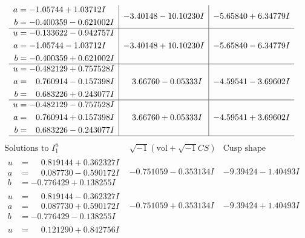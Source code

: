 \documentclass[1p]{elsarticle_modified}
\theoremstyle{definition}
\newcommand{\I}{\sqrt{-1}}
\begin{document}
$$\begin{array}{c|c|c}
\begin{aligned}
a &= -1.05744 + 1.03712 I \\
b &= -0.400359 - 0.621002 I\end{aligned}
 & -3.40148 - 10.10230 I & -5.65840 + 6.34779 I \\ \hline\begin{aligned}
u &= -0.133622 - 0.942757 I \\
a &= -1.05744 - 1.03712 I \\
b &= -0.400359 + 0.621002 I\end{aligned}
 & -3.40148 + 10.10230 I & -5.65840 - 6.34779 I \\ \hline\begin{aligned}
u &= -0.482129 + 0.757528 I \\
a &= \phantom{-}0.760914 - 0.157398 I \\
b &= \phantom{-}0.683226 + 0.243077 I\end{aligned}
 & \phantom{-}3.66760 - 0.05333 I & -4.59541 - 3.69602 I \\ \hline\begin{aligned}
u &= -0.482129 - 0.757528 I \\
a &= \phantom{-}0.760914 + 0.157398 I \\
b &= \phantom{-}0.683226 - 0.243077 I\end{aligned}
 & \phantom{-}3.66760 + 0.05333 I & -4.59541 + 3.69602 I\\
 \hline 
 \end{array}$$\newpage$$\begin{array}{c|c|c}  
\text{Solutions to }I^u_{1}& \I (\text{vol} + \sqrt{-1}CS) & \text{Cusp shape}\\
 \hline 
\begin{aligned}
u &= \phantom{-}0.819144 + 0.362327 I \\
a &= \phantom{-}0.087730 - 0.590172 I \\
b &= -0.776429 + 0.138255 I\end{aligned}
 & -0.751059 - 0.353134 I & -9.39424 - 1.40493 I \\ \hline\begin{aligned}
u &= \phantom{-}0.819144 - 0.362327 I \\
a &= \phantom{-}0.087730 + 0.590172 I \\
b &= -0.776429 - 0.138255 I\end{aligned}
 & -0.751059 + 0.353134 I & -9.39424 + 1.40493 I \\ \hline\begin{aligned}
u &= \phantom{-}0.121290 + 0.842756 I \\

\end{aligned}
\end{array}$$
\end{document}
